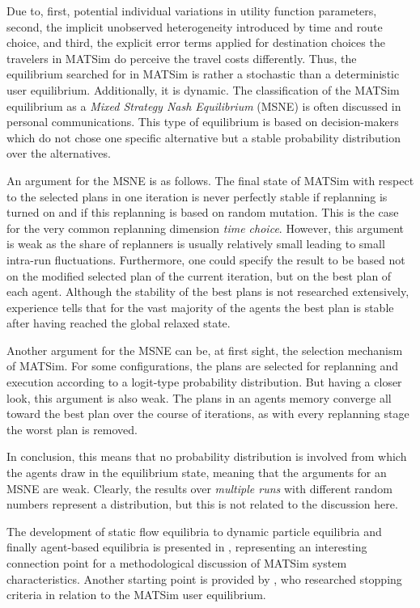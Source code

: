 Due to, first, potential individual variations in utility function parameters, second, the implicit unobserved heterogeneity introduced by time and route choice, and third, the explicit error terms applied for destination choices the travelers in MATSim do perceive the travel costs differently. Thus, the equilibrium searched for in MATSim is rather a stochastic than a deterministic user equilibrium. Additionally, it is dynamic. The classification of the MATSim equilibrium as a \emph{Mixed Strategy Nash Equilibrium} (MSNE) is often discussed in personal communications. This type of equilibrium is based on decision-makers which do not chose one specific alternative but a stable probability distribution over the alternatives. 

An argument for the MSNE is as follows. The final state of MATSim with respect to the selected plans in one iteration is never perfectly stable if replanning is turned on and if this replanning is based on random mutation. This is the case for the very common replanning dimension \emph{time choice}. However, this argument is weak as the share of replanners is usually relatively small leading to small intra-run fluctuations. Furthermore, one could specify the result to be based not on the modified selected plan of the current iteration, but on the best plan of each agent. Although the stability of the best plans is not researched extensively, experience tells that for the vast majority of the agents the best plan is stable after having reached the global relaxed state.  

Another argument for the MSNE can be, at first sight, the selection mechanism of MATSim. For some configurations, the plans are selected for replanning and execution according to a logit-type probability distribution. But having a closer look, this argument is also weak. The plans in an agents memory converge all toward the best plan over the course of iterations, as with every replanning stage the worst plan is removed. 

In conclusion, this means that no probability distribution is involved from which the agents draw in the equilibrium state, meaning that the arguments for an MSNE are weak. Clearly, the results over \emph{multiple runs} with different random numbers represent a distribution, but this is not related to the discussion here.

The development of static flow equilibria to dynamic particle equilibria and finally agent-based equilibria is presented in \citet[][]{Nagel_unpub_Latsis_2012, NagelFloetteroed_IATBR_2009}, representing an interesting connection point for a methodological discussion of MATSim system characteristics. Another starting point is provided by \citet[][]{Meister_PhDThesis_2011}, who researched stopping criteria in relation to the MATSim user equilibrium.

